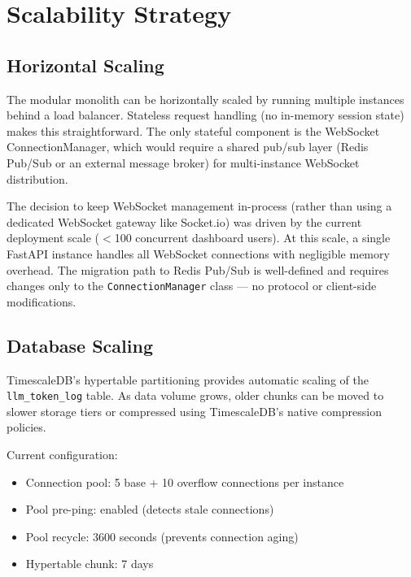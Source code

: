 \documentclass[12pt,a4paper,twoside]{report}
\begin{document}
\section{Scalability Strategy}

\subsection{Horizontal Scaling}
\label{sec:horizontal-scaling}

The modular monolith can be horizontally scaled by running multiple instances behind a load balancer. Stateless request handling (no in-memory session state) makes this straightforward. The only stateful component is the WebSocket ConnectionManager, which would require a shared pub/sub layer (Redis Pub/Sub or an external message broker) for multi-instance WebSocket distribution.

\begin{designdecision}
The decision to keep WebSocket management in-process (rather than using a dedicated WebSocket gateway like Socket.io) was driven by the current deployment scale ($<$100 concurrent dashboard users). At this scale, a single FastAPI instance handles all WebSocket connections with negligible memory overhead. The migration path to Redis Pub/Sub is well-defined and requires changes only to the \texttt{ConnectionManager} class — no protocol or client-side modifications.
\end{designdecision}

\subsection{Database Scaling}

TimescaleDB's hypertable partitioning provides automatic scaling of the \texttt{llm\_token\_log} table. As data volume grows, older chunks can be moved to slower storage tiers or compressed using TimescaleDB's native compression policies.

Current configuration:
\begin{itemize}
  \item Connection pool: 5 base + 10 overflow connections per instance
  \item Pool pre-ping: enabled (detects stale connections)
  \item Pool recycle: 3600 seconds (prevents connection aging)
  \item Hypertable chunk: 7 days
\end{itemize}
\end{document}
